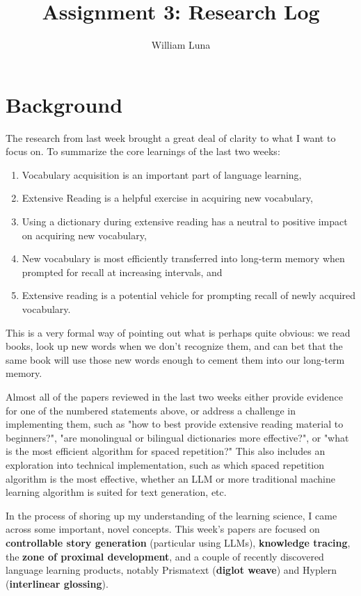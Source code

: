 \documentclass[
	letterpaper, %
]{jdf}
\author{William Luna}
\title{Assignment 3: Research Log}
\begin{document}

\maketitle

\section{Background}
The research from last week brought a great deal of clarity to what I want to focus on. To summarize the core learnings of the last two weeks:
\begin{enumerate}
    \item Vocabulary acquisition is an important part of language learning,
    \item Extensive Reading is a helpful exercise in acquiring new vocabulary,
    \item Using a dictionary during extensive reading has a neutral to positive impact on acquiring new vocabulary,
    \item New vocabulary is most efficiently transferred into long-term memory when prompted for recall at increasing intervals, and
    \item Extensive reading is a potential vehicle for prompting recall of newly acquired vocabulary.
\end{enumerate}

This is a very formal way of pointing out what is perhaps quite obvious: we read books, look up new words when we don't recognize them, and can bet that the same book will use those new words enough to cement them into our long-term memory.    

Almost all of the papers reviewed in the last two weeks either provide evidence for one of the numbered statements above, or address a challenge in implementing them, such as "how to best provide extensive reading material to beginners?", "are monolingual or bilingual dictionaries more effective?", or "what is the most efficient algorithm for spaced repetition?" This also includes an exploration into technical implementation, such as which spaced repetition algorithm is the most effective, whether an LLM or more traditional machine learning algorithm is suited for text generation, etc. 

In the process of shoring up my understanding of the learning science, I came across some important, novel concepts. This week's papers are focused on \textbf{controllable story generation} (particular using LLMs), \textbf{knowledge tracing}, the \textbf{zone of proximal development}, and a couple of recently discovered language learning products, notably Prismatext (\textbf{diglot weave}) and Hyplern (\textbf{interlinear glossing}).
\end{document}
